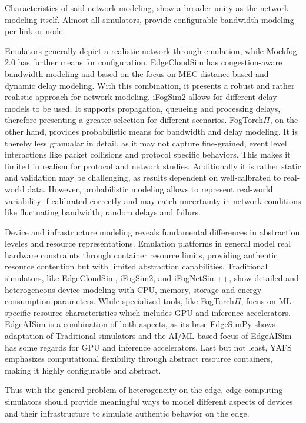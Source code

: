 Characteristics of said network modeling, show a broader unity as the network modeling itself.
Almost all simulators, provide configurable bandwidth modeling per link or node.

Emulators generally depict a realistic network through emulation, while Mockfog 2.0 has further means for configuration.
EdgeCloudSim has congestion-aware bandwidth modeling and based on the focus on MEC distance based and dynamic delay modeling.
With this combination, it presents a robust and rather realistic approach for network modeling.
iFogSim2 allows for different delay models to be used. 
It supports propagation, queueing and processing delays, therefore presenting a greater selection for different scenarios.
FogTorch$\Pi$, on the other hand, provides probabilistic means for bandwidth and delay modeling.
It is thereby less granualar in detail, as it may not capture fine-grained, event level interactions like packet collisions and protocol specific behaviors.
This makes it limited in realism for protocol and network studies.
Additionally it is rather static and validation may be challenging, as results dependent on well-calbrated to real-world data.
However, probabilistic modeling allows to represent real-world variability if calibrated correctly and may catch uncertainty in network conditions like fluctuating bandwidth, random delays and failurs.

Device and infrastructure modeling reveals fundamental differences in abstraction leveles and resource representations.
Emulation platforms in general model real hardware constraints through container resource limits, providing authentic resource contention but with limited abstraction capabilities.
Traditional simulators, like EdgeCloudSim, iFogSim2, and iFogNetSim++, show detailed and heterogeneous device modeling with CPU, memory, storage and energy consumption parameters.
While specialized tools, like FogTorch$\Pi$, focus on ML-specific resource characteristics which includes GPU and inference accelerators.
EdgeAISim is a combination of both aspects, as its base EdgeSimPy shows adaptation of Traditional simulators and the AI/ML based focus of EdgeAISim has some regards for GPU and inference accelerators.
Last but not least, YAFS emphasizes computational flexibility through abstract resource containers, making it highly configurable and abstract.

Thus with the general problem of heterogeneity on the edge, edge computing simulators should provide meaningful ways to model different aspects of devices and their infrastructure
to simulate authentic behavior on the edge.

